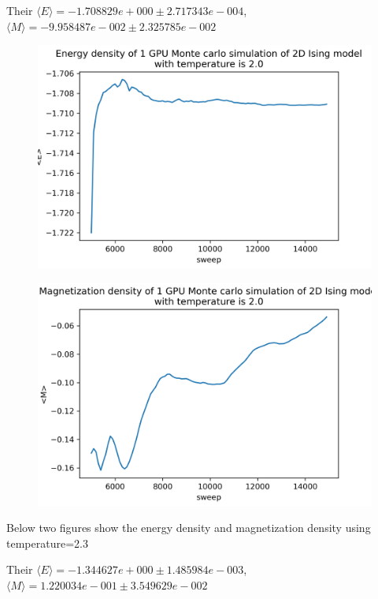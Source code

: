 \documentclass{article}
\begin{document}
	Their $\langle E\rangle = -1.708829e+000 \pm 2.717343e-004$, $\langle M\rangle = -9.958487e-002 \pm 2.325785e-002$
	
	\begin{figure}[hb!]
		\centering
		\includegraphics[width=0.8\linewidth]{notebook/1gpu_2.0_E}
	\end{figure}
	\begin{figure}[hb!]
		\centering
		\includegraphics[width=0.8\linewidth]{notebook/1gpu_2.0_M}
	\end{figure}
	\newpage

	Below two figures show the energy density and magnetization density using temperature=2.3

	Their $\langle E\rangle = -1.344627e+000 \pm 1.485984e-003$, $\langle M\rangle = 1.220034e-001 \pm 3.549629e-002$
\end{document}
